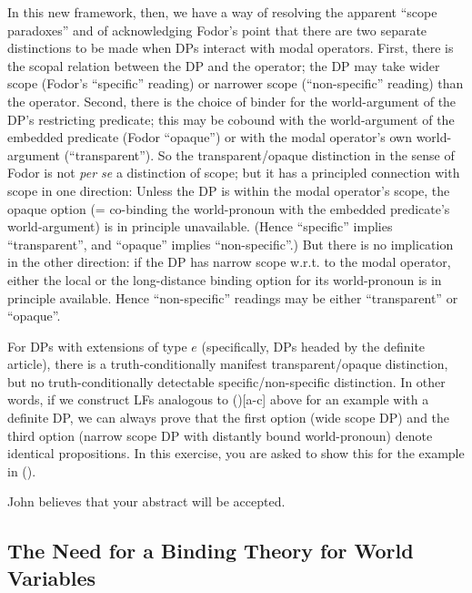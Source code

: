In this new framework, then, we have a way of resolving the apparent ``scope paradoxes'' and of acknowledging Fodor's point that there are two separate distinctions to be made when DPs interact with modal operators. First, there is the scopal relation between the DP and the operator; the DP may take wider scope (Fodor's ``specific'' reading) or narrower scope (``non-specific'' reading) than the operator. Second, there is the choice of binder for the world-argument of the DP's restricting predicate; this may be cobound with the world-argument of the embedded predicate (Fodor ``opaque'') or with the modal operator's own world-argument (``transparent''). So the transparent/opaque distinction in the sense of Fodor is not \emph{per se} a distinction of scope; but it has a principled connection with scope in one direction: Unless the DP is within the modal operator's scope, the opaque option (= co-binding the world-pronoun with the embedded predicate's world-argument) is in principle unavailable. (Hence ``specific'' implies ``transparent'', and ``opaque'' implies ``non-specific''.) But there is no implication in the other direction: if the DP has narrow scope w.r.t. to the modal operator, either the local or the long-distance binding option for its world-pronoun is in principle available. Hence ``non-specific'' readings may be either ``transparent'' or ``opaque''.

\begin{exercise}\label{yourabstract}
	
	For DPs with extensions of type $e$ (specifically, DPs headed by the definite article), there is a truth-conditionally manifest transparent/opaque distinction, but no truth-conditionally detectable specific/non-specific distinction. In other words, if we construct LFs analogous to (\lastx)[a-c] above for an example with a definite DP, we can always prove that the first option (wide scope DP) and the third option (narrow scope DP with distantly bound world-pronoun) denote identical propositions. In this exercise, you are asked to show this for the example in (\nextx).
	
	\ex John believes that your abstract will be accepted. \eex \xe

\end{exercise}

\subsection{The Need for a Binding Theory for World Variables}

